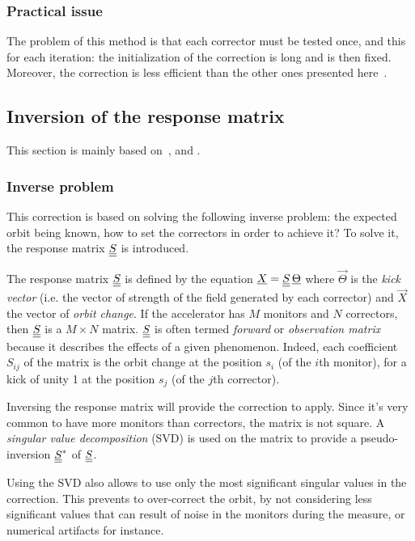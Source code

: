 \subsubsection{Practical issue}
The problem of this method is that each corrector must be tested once, and this for each iteration: the initialization of the correction is long and is then fixed. Moreover, the correction is less efficient than the other ones presented here~\cite{book:wille}.

\subsection{Inversion of the response matrix}
\label{sec:response_matrix}
This section is mainly based on~\cite{book:wille}, \cite{art:decker-1991} and \cite{art:plouviez-1999}.

\subsubsection{Inverse problem}
This correction is based on solving the following inverse problem: the expected orbit being known, how to set the correctors in order to achieve it? To solve it, the response matrix $\underline{\underline{S}}$ is introduced.

The response matrix $\underline{\underline{S}}$ is defined by the equation $\underline{X} = \underline{\underline{S}}\, \underline{\Theta}$ where $\vec{\Theta}$ is the \emph{kick vector} (i.e. the vector of strength of the field generated by each corrector) and $\vec{X}$ the vector of \emph{orbit change}. If the accelerator has $M$ monitors and $N$ correctors, then $\underline{\underline{S}}$ is a $M \times N$ matrix. $\underline{\underline{S}}$ is often termed \emph{forward} or \emph{observation matrix} because it describes the effects of a given phenomenon. Indeed, each coefficient $S_{ij}$ of the matrix is the orbit change at the position $s_i$ (of the $i$th monitor), for a kick of unity 1 at the position $s_j$ (of the $j$th corrector).

Inversing the response matrix will provide the correction to apply. Since it's very common to have more monitors than correctors, the matrix is not square. A \emph{singular value decomposition} (SVD) is used on the matrix to provide a pseudo-inversion $\underline{\underline{S}}^*$ of $\underline{\underline{S}}$.

Using the SVD also allows to use only the most significant singular values in the correction. This prevents to over-correct the orbit, by not considering less significant values that can result of noise in the monitors during the measure, or numerical artifacts for instance.

